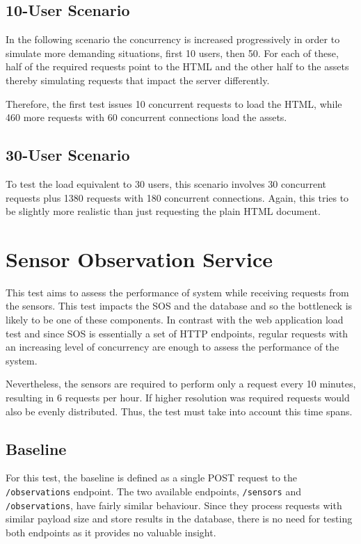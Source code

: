 \subsection*{10-User Scenario}

In the following scenario the concurrency is increased progressively in order to simulate more demanding situations, first 10 users, then 50. For each of these, half of the required requests point to the HTML and the other half to the assets thereby simulating requests that impact the server differently.

Therefore, the first test issues 10 concurrent requests to load the HTML, while 460 more requests with 60 concurrent connections load the assets.

\subsection*{30-User Scenario}

To test the load equivalent to 30 users, this scenario involves 30 concurrent requests plus 1380 requests with 180 concurrent connections. Again, this tries to be slightly more realistic than just requesting the plain HTML document.

\section{Sensor Observation Service}

This test aims to assess the performance of system while receiving requests from the sensors. This test impacts the SOS and the database and so the bottleneck is likely to be one of these components. In contrast with the web application load test and since SOS is essentially a set of HTTP endpoints, regular requests with an increasing level of concurrency are enough to assess the performance of the system.

Nevertheless, the sensors are required to perform only a request every 10 minutes, resulting in 6 requests per hour. If higher resolution was required requests would also be evenly distributed. Thus, the test must take into account this time spans.

\subsection*{Baseline}

For this test, the baseline is defined as a single POST request to the \texttt{/observations} endpoint. The two available endpoints, \texttt{/sensors} and \texttt{/observations}, have fairly similar behaviour. Since they process requests with similar payload size and store results in the database, there is no need for testing both endpoints as it provides no valuable insight.

